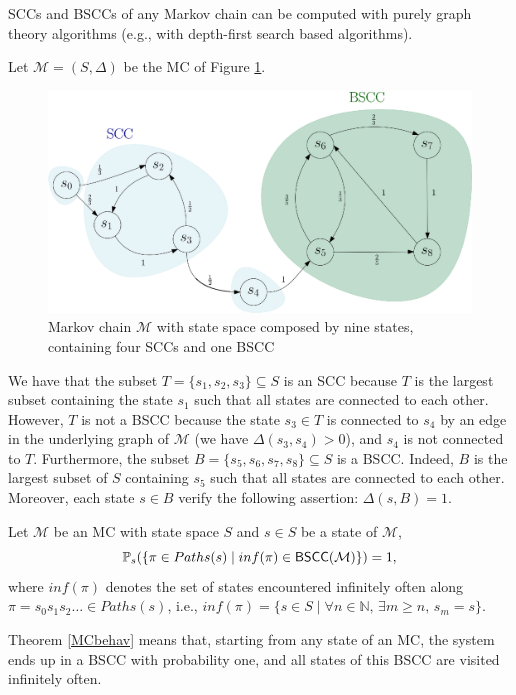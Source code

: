 SCCs and BSCCs of any Markov chain can be computed with
purely graph theory algorithms (e.g., with depth-first search based algorithms).

\begin{example}
Let $\mathcal{M}=(S, \Delta)$ be the MC of Figure \ref{bsccex}.
  \begin{figure}[H]
    \centering
    \includegraphics[width=0.7\linewidth]{resources/BSCC}
    \captionsetup{justification=centering}
    \caption{Markov chain $\mathcal{M}$ with state space composed by nine states, containing four SCCs and one BSCC}\label{bsccex}
  \end{figure}
\end{example}
\noindent We have that the subset $T = \{s_1, s_2, s_3\} \subseteq S$ is an SCC because $T$ is the largest subset containing the state $s_1$ such that all states are connected to each other.
However, $T$ is not a BSCC because the state $s_3 \in T$ is connected to $s_4$ by an edge in the underlying graph of $\mathcal{M}$ (we have $\Delta(s_3, s_4) > 0$), and $s_4$ is not connected to $T$.
Furthermore, the subset $B = \{s_5, s_6, s_7, s_8\} \subseteq S$ is a BSCC.
Indeed, $B$ is the largest subset of $S$ containing $s_5$ such that all states are connected to each other. Moreover, each state $s \in B$ verify the following assertion:
$\Delta(s, B)=1$.

\begin{theorem}\label{MCbehav}
Let $\mathcal{M}$ be an MC with state space $S$ and $s \in S$
be a state of $\mathcal{M}$,
\[
  \mathbb{P}_s(\{\pi \in Paths(s) \; | \; inf(\pi) \in \textnormal{\sffamily BSCC}(\mathcal{M})\}) = 1,
\]
where $inf(\pi)$ denotes the set of states encountered infinitely often along $\pi = s_0 s_1 s_2 \dots \in Paths(s)$, i.e., $inf(\pi) = \{ s \in S \; | \; \forall n \in \mathbb{N},\, \exists m \geq n,\, s_m = s\}$.
\end{theorem}
Theorem \ref{MCbehav} means that, starting from any state of an MC, the system ends up in a BSCC with probability one, and all states of this BSCC are visited infinitely often.

